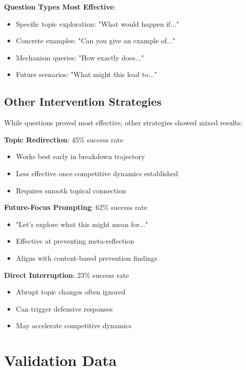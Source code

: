 \documentclass[11pt,letterpaper]{article}
\begin{document}
\textbf{Question Types Most Effective}:
\begin{itemize}
    \item Specific topic exploration: "What would happen if..."
    \item Concrete examples: "Can you give an example of..."
    \item Mechanism queries: "How exactly does..."
    \item Future scenarios: "What might this lead to..."
\end{itemize}

\subsection{Other Intervention Strategies}

While questions proved most effective, other strategies showed mixed results:

\textbf{Topic Redirection}: 45\% success rate
\begin{itemize}
    \item Works best early in breakdown trajectory
    \item Less effective once competitive dynamics established
    \item Requires smooth topical connection
\end{itemize}

\textbf{Future-Focus Prompting}: 62\% success rate
\begin{itemize}
    \item "Let's explore what this might mean for..."
    \item Effective at preventing meta-reflection
    \item Aligns with content-based prevention findings
\end{itemize}

\textbf{Direct Interruption}: 23\% success rate
\begin{itemize}
    \item Abrupt topic changes often ignored
    \item Can trigger defensive responses
    \item May accelerate competitive dynamics
\end{itemize}

\section{Validation Data}
\label{app:performance}
\end{document}
